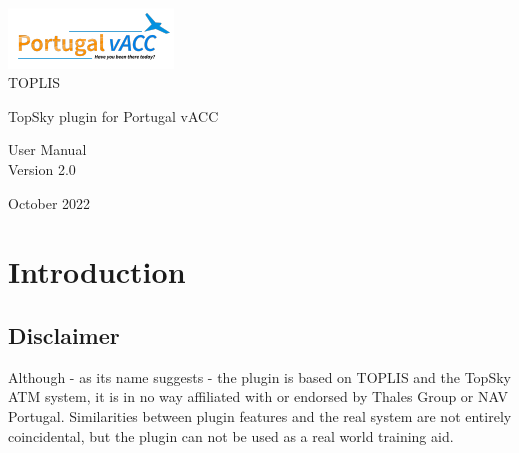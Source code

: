\documentclass[11pt,a4paper,oldfontcommands]{memoir}
\begin{document}
%
%
\thispagestyle{empty}

{%
\sffamily

\centering
\Large

~\vspace{\fill}

{\huge 
\includegraphics{img/logo.png}\\
TOPLIS
}

\vspace{2.5cm}

{\LARGE
TopSky plugin for Portugal vACC
}

\vspace{3.5cm}

User Manual\\
Version 2.0\\

\vspace{\fill}

October 2022

}%

\cleardoublepage

\tableofcontents*

\clearpage


\chapter{Introduction}

\section{Disclaimer}
Although - as its name suggests - the plugin is based on TOPLIS and the TopSky ATM system, it is in no way affiliated with or endorsed by Thales Group or NAV Portugal. Similarities between plugin features and the real system are not entirely coincidental, but the plugin can not be used as a real world training aid. ~\cite{git}\\
\end{document}
